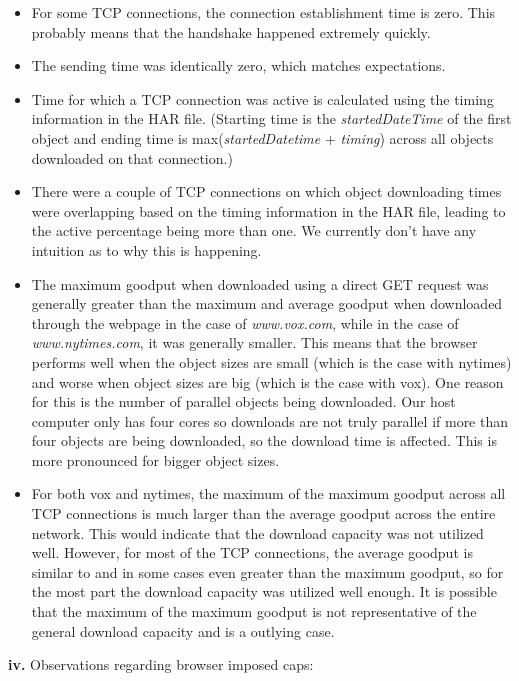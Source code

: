 \documentclass[12pt]{article}
\begin{document}
\begin{itemize}
\item For some TCP connections, the connection establishment time is zero. This probably means that the handshake happened extremely quickly.
\item The sending time was identically zero, which matches expectations.
\item Time for which a TCP connection was active is calculated using the timing information in the HAR file. (Starting time is the \emph{startedDateTime} of the first object and ending time is max(\emph{startedDatetime} + \emph{timing}) across all objects downloaded on that connection.)
\item There were a couple of TCP connections on which object downloading times were overlapping based on the timing information in the HAR file, leading to the active percentage being more than one. We currently don't have any intuition as to why this is happening.
\item The maximum goodput when downloaded using a direct GET request was generally greater than the maximum and average goodput when downloaded through the webpage in the case of \emph{www.vox.com}, while in the case of \emph{www.nytimes.com}, it was generally smaller. This means that the browser performs well when the object sizes are small (which is the case with nytimes) and worse when object sizes are big (which is the case with vox). One reason for this is the number of parallel objects being downloaded. Our host computer only has four cores so downloads are not truly parallel if more than four objects are being downloaded, so the download time is affected. This is more pronounced for bigger object sizes.
\item For both vox and nytimes, the maximum of the maximum goodput across all TCP connections is much larger than the average goodput across the entire network. This would indicate that the download capacity was not utilized well. However, for most of the TCP connections, the average goodput is similar to and in some cases even greater than the maximum goodput, so for the most part the download capacity was utilized well enough. It is possible that the maximum of the maximum goodput is not representative of the general download capacity and is a outlying case.
\end{itemize}
\textbf{iv.} Observations regarding browser imposed caps:
\end{document}
